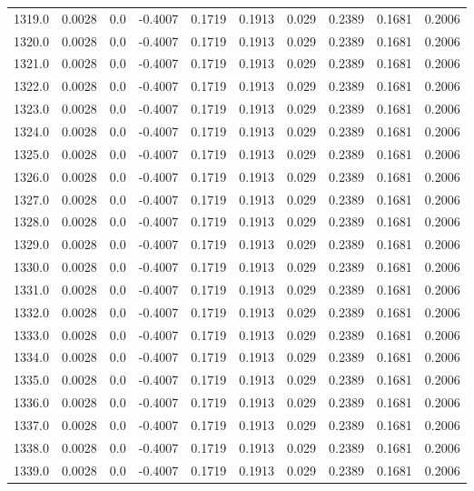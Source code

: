\begin{longtable}{lrrrrrrrrr}
1319.0 & 0.0028 & 0.0 & -0.4007 & 0.1719 & 0.1913 & 0.029 & 0.2389 & 0.1681 & 0.2006 \\
1320.0 & 0.0028 & 0.0 & -0.4007 & 0.1719 & 0.1913 & 0.029 & 0.2389 & 0.1681 & 0.2006 \\
1321.0 & 0.0028 & 0.0 & -0.4007 & 0.1719 & 0.1913 & 0.029 & 0.2389 & 0.1681 & 0.2006 \\
1322.0 & 0.0028 & 0.0 & -0.4007 & 0.1719 & 0.1913 & 0.029 & 0.2389 & 0.1681 & 0.2006 \\
1323.0 & 0.0028 & 0.0 & -0.4007 & 0.1719 & 0.1913 & 0.029 & 0.2389 & 0.1681 & 0.2006 \\
1324.0 & 0.0028 & 0.0 & -0.4007 & 0.1719 & 0.1913 & 0.029 & 0.2389 & 0.1681 & 0.2006 \\
1325.0 & 0.0028 & 0.0 & -0.4007 & 0.1719 & 0.1913 & 0.029 & 0.2389 & 0.1681 & 0.2006 \\
1326.0 & 0.0028 & 0.0 & -0.4007 & 0.1719 & 0.1913 & 0.029 & 0.2389 & 0.1681 & 0.2006 \\
1327.0 & 0.0028 & 0.0 & -0.4007 & 0.1719 & 0.1913 & 0.029 & 0.2389 & 0.1681 & 0.2006 \\
1328.0 & 0.0028 & 0.0 & -0.4007 & 0.1719 & 0.1913 & 0.029 & 0.2389 & 0.1681 & 0.2006 \\
1329.0 & 0.0028 & 0.0 & -0.4007 & 0.1719 & 0.1913 & 0.029 & 0.2389 & 0.1681 & 0.2006 \\
1330.0 & 0.0028 & 0.0 & -0.4007 & 0.1719 & 0.1913 & 0.029 & 0.2389 & 0.1681 & 0.2006 \\
1331.0 & 0.0028 & 0.0 & -0.4007 & 0.1719 & 0.1913 & 0.029 & 0.2389 & 0.1681 & 0.2006 \\
1332.0 & 0.0028 & 0.0 & -0.4007 & 0.1719 & 0.1913 & 0.029 & 0.2389 & 0.1681 & 0.2006 \\
1333.0 & 0.0028 & 0.0 & -0.4007 & 0.1719 & 0.1913 & 0.029 & 0.2389 & 0.1681 & 0.2006 \\
1334.0 & 0.0028 & 0.0 & -0.4007 & 0.1719 & 0.1913 & 0.029 & 0.2389 & 0.1681 & 0.2006 \\
1335.0 & 0.0028 & 0.0 & -0.4007 & 0.1719 & 0.1913 & 0.029 & 0.2389 & 0.1681 & 0.2006 \\
1336.0 & 0.0028 & 0.0 & -0.4007 & 0.1719 & 0.1913 & 0.029 & 0.2389 & 0.1681 & 0.2006 \\
1337.0 & 0.0028 & 0.0 & -0.4007 & 0.1719 & 0.1913 & 0.029 & 0.2389 & 0.1681 & 0.2006 \\
1338.0 & 0.0028 & 0.0 & -0.4007 & 0.1719 & 0.1913 & 0.029 & 0.2389 & 0.1681 & 0.2006 \\
1339.0 & 0.0028 & 0.0 & -0.4007 & 0.1719 & 0.1913 & 0.029 & 0.2389 & 0.1681 & 0.2006 \\

\end{longtable}
